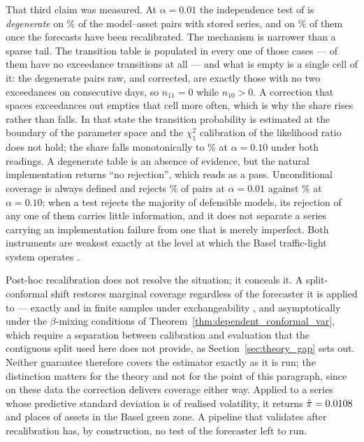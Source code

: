 \documentclass[preprint,11pt,authoryear]{elsarticle}
\newcommand{\1}{\boldsymbol{1}}
\begin{document}
That third claim was measured. At $\alpha = 0.01$ the
independence test of \citet{christoffersen1998} is \emph{degenerate} on
\nSeqCCUndefRawOne\% of the \nSeqPairs{} model--asset pairs with stored series,
and on \nSeqCCUndefCorOne\% of them once the forecasts have been recalibrated.
The mechanism is narrower than a sparse tail. The transition table is populated
in every one of those cases --- \nSeqCCBothZeroRaw{} of them have no exceedance
transitions at all --- and what is empty is a single cell of it: the
\nSeqCCNoConsecRaw{} degenerate pairs raw, and \nSeqCCNoConsecCor{} corrected,
are exactly those with no two exceedances on consecutive days, so $n_{11} = 0$
while $n_{10} > 0$. A correction that spaces exceedances out empties that cell
more often, which is why the share rises rather than falls. In that
state the transition probability is estimated at the boundary of the parameter
space and the $\chi^2_1$ calibration of the likelihood ratio does not hold; the
share falls monotonically to \nSeqCCUndefRawTen\% at $\alpha = 0.10$ under both
readings. A degenerate table is an absence of evidence, but the natural
implementation returns ``no rejection'', which reads as a pass. Unconditional
coverage \citep{kupiec1995} is always defined and rejects \nSeqKupiecRejRawOne\%
of pairs at $\alpha = 0.01$ against \nSeqKupiecRejRawTen\% at $\alpha = 0.10$;
when a test rejects the majority of defensible models, its rejection of any one
of them carries little information, and it does not separate a series carrying an
implementation failure from one that is merely imperfect. Both instruments are
weakest exactly at the level at which the Basel traffic-light system operates
\citep{basel1996}.

Post-hoc recalibration does not resolve the situation; it conceals it. A
split-conformal shift restores marginal coverage regardless of the forecaster it
is applied to --- exactly and in finite samples under exchangeability
\citep{vovk2005algorithmic,lei2018distribution}, and asymptotically under the
$\beta$-mixing conditions of Theorem~\ref{thm:dependent_conformal_var}, which
require a separation between calibration and evaluation that the contiguous split
used here does not provide, as Section~\ref{sec:theory_gap} sets out. Neither
guarantee therefore covers the estimator exactly as it is run; the distinction
matters for the theory and not for the point of this paragraph, since on these
data the correction delivers coverage either way. Applied to a series whose predictive
standard deviation is \nDispDefaultSmall{} of realised volatility, it returns
$\hat\pi = 0.0108$ and places \nTruncCorGreen{} of \nMainAssets{} assets in
the Basel green zone. A pipeline that validates after recalibration has,
by construction, no test of the forecaster left to run.
\end{document}
